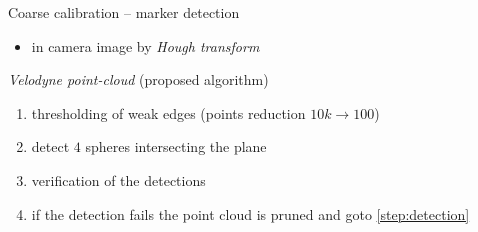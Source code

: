 \documentclass[pdf]{beamer}
\begin{document}
	\begin{frame}{Coarse calibration -- marker detection}
		\begin{itemize}
			\item in camera image by \emph{Hough transform}
		\end{itemize}
		\begin{alertblock}{\emph{Velodyne point-cloud} (proposed algorithm)}
		\begin{enumerate}
			\item thresholding of weak edges (points reduction $10k \rightarrow 100$)
			\item detect $4$ spheres intersecting the plane \label{step:detection}
			\item verification of the detections
			\item if the detection fails the point cloud is pruned and goto \ref{step:detection}
		\end{enumerate}
		\end{alertblock}

		\setcounter{subfigure}{0}
		\begin{figure}[h]
			\centering
			\quad
			\quad
		\end{figure}
	\end{frame}
\end{document}
